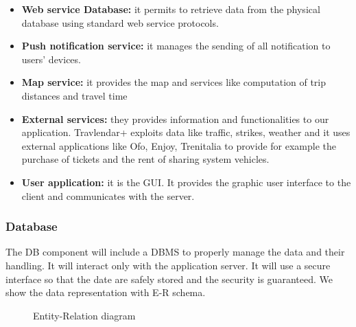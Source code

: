 \documentclass[12pt,titlepage]{article}
\begin{document}
\begin{flushleft}
\begin{itemize}
\item \textbf{Web service Database:} it permits to retrieve data from the physical database using standard web service protocols.
\item \textbf{Push notification service:} it manages the sending of all notification to users' devices.
\item \textbf{Map service:} it provides the map and services like computation of trip distances and travel time
\item \textbf{External services:} they provides information and functionalities to our application. Travlendar+ exploits data like traffic, strikes, weather and it uses external applications like Ofo, Enjoy, Trenitalia to provide for example the purchase of tickets and the rent of sharing system vehicles.
\item \textbf{User application: } it is the GUI. It provides the graphic user interface to the client and communicates with the server.
\end{itemize}
\end{flushleft}

\clearpage
\newpage

\begin{landscape}
\subsubsection{Database}
The DB component will include a DBMS to properly manage the data and their handling. It will interact only with the application server. It will use a secure interface so that the date are safely stored and the security is guaranteed.
We show the data representation with  E-R schema.
\begin{figure}[H]
\centering
{}
\caption{Entity-Relation diagram}
\end{figure}
\end{landscape}
\clearpage
\newpage
\end{document}
